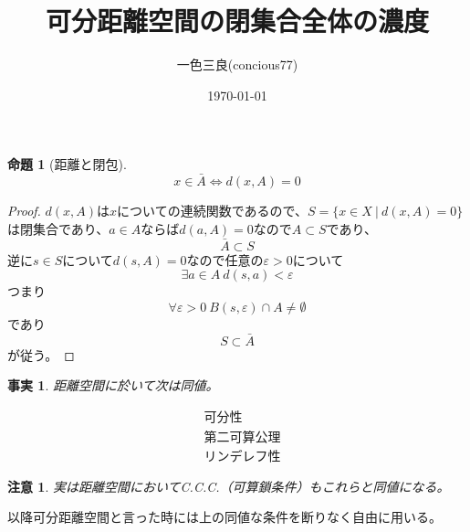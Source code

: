 \documentclass{jsarticle}
\title{可分距離空間の閉集合全体の濃度}
\author{一色三良(concious77)}
\date{\today}
\newtheorem{prop}[thm]{命題}
\newtheorem{fact}[thm]{事実}
\newtheorem*{cau}{注意}
\begin{document}
\maketitle



\begin{prop}[距離と閉包]
\[
x\in \bar{A}\iff d(x,A)=0
\]
\end{prop}

\begin{proof}
$d(x,A)$は$x$についての連続関数であるので、$S=\{x\in X\ |\ d(x,A)=0\}$は閉集合であり、$a\in A$ならば$d(a,A)=0$なので$A\subset S$であり、
\[
\bar{A}\subset S
\]
逆に$s\in S$について$d(s,A)=0$なので任意の$\varepsilon>0$について
\[
\exists a\in A\ d(s,a)<\varepsilon
\]
つまり
\[
\forall \varepsilon >0\  B(s,\varepsilon)\cap A\neq \emptyset
\]であり
\[
S\subset \bar{A}
\]
が従う。
\end{proof}

\begin{fact}距離空間に於いて次は同値。

\begin{eqnarray}
&可分性\\ 
&第二可算公理\\ 
&リンデレフ性
\end{eqnarray}

\end{fact}
\begin{cau}
実は距離空間においてC.C.C.（可算鎖条件）もこれらと同値になる。
\end{cau}

以降可分距離空間と言った時には上の同値な条件を断りなく自由に用いる。
\end{document}
